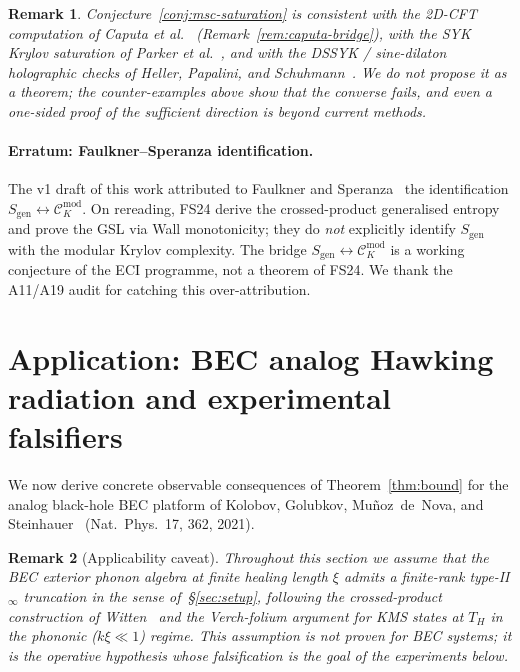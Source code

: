 \documentclass[12pt,a4paper]{article}
\newtheorem{remark}{Remark}
\begin{document}
\begin{remark}
Conjecture~\ref{conj:msc-saturation} is consistent with the
2D-CFT computation of Caputa et al.~\cite{Caputa2024}
(Remark~\ref{rem:caputa-bridge}), with the SYK Krylov saturation
of Parker et al.~\cite{Parker2019}, and with the DSSYK / sine-dilaton
holographic checks of Heller, Papalini, and
Schuhmann~\cite{HellerPapalini2024}.
We do not propose it as a theorem; the counter-examples above
show that the converse fails, and even a one-sided proof of the
sufficient direction is beyond current methods.
\end{remark}

\paragraph{Erratum: Faulkner--Speranza identification.}
The v1 draft of this work attributed to Faulkner and
Speranza~\cite{FaulknerSperanza2024} the identification
$S_{\mathrm{gen}} \leftrightarrow \mathcal{C}_K^{\mathrm{mod}}$.
On rereading, FS24 derive the crossed-product generalised entropy
and prove the GSL via Wall monotonicity; they do \emph{not}
explicitly identify $S_{\mathrm{gen}}$ with the modular Krylov
complexity.
The bridge $S_{\mathrm{gen}} \leftrightarrow \mathcal{C}_K^{\mathrm{mod}}$
is a working conjecture of the ECI programme, not a theorem of FS24.
We thank the A11/A19 audit for catching this over-attribution.

\section{Application: BEC analog Hawking radiation and experimental
         falsifiers}
\label{sec:bec}

We now derive concrete observable consequences of
Theorem~\ref{thm:bound} for the analog black-hole BEC platform of
Kolobov, Golubkov, Mu\~{n}oz~de~Nova, and Steinhauer~\cite{Kolobov2021}
(Nat.~Phys.~17, 362, 2021).

\begin{remark}[Applicability caveat]
\label{rem:bec-caveat}
Throughout this section we assume that the BEC exterior phonon algebra
at finite healing length $\xi$ admits a finite-rank type-II$_\infty$
truncation in the sense of~\S\ref{sec:setup}, following the crossed-product
construction of Witten~\cite{Witten2022} and the Verch-folium argument
for KMS states at $T_H$ in the phononic ($k\xi \ll 1$) regime.
This assumption is not proven for BEC systems; it is the operative
hypothesis whose falsification is the goal of the experiments below.
\end{remark}
\end{document}
